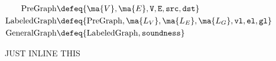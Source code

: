 
\begin{figure}[t]
        \begin{gather*}
          \begin{aligned}
            \mathrm{PreGraph}\defeq\{&\ma{V}, \ma{E}, \mathtt{V}, \mathtt{E}, \mathtt{src}, \mathtt{dst}\} \\
            \mathrm{LabeledGraph}\defeq\{&\mathrm{PreGraph},\ma{L_{V}},\ma{L_{E}},\ma{L_{G}}, \mathtt{vl},\mathtt{el},\mathtt{gl}\} \\
            \mathrm{GeneralGraph}\defeq\{&\mathrm{LabeledGraph},
            \mathtt{soundness}\}
          \end{aligned}\\
        \end{gather*}
\caption{JUST INLINE THIS}
\label{fig:coqgraphs}
\vspace{-1em}
\end{figure} 